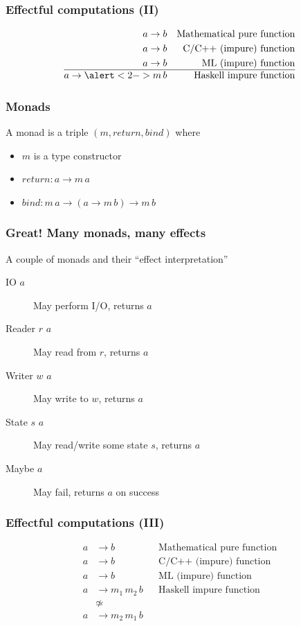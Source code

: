 \begin{frame}
  \frametitle{Effectful computations (II)}
  \begin{align*}
    a \to b && \text{Mathematical pure function}\\
    a \to b && \text{C/C++ (impure) function}\\
    a \to b && \text{ML (impure) function}\\
    \hline
    a \to \alert<2->{m}\, b && \text{Haskell impure function}
  \end{align*}
\end{frame}

\begin{frame}
  \frametitle{Monads}
  \begin{definition}
    A monad is a triple $(m, return, bind)$ where
    \begin{itemize}
      \item $m$ is a type constructor
      \item $return : a \to m\, a$
      \item $bind   : m\, a \to (a \to m\, b) \to m\, b$
    \end{itemize}
  \end{definition}
\end{frame}

\begin{frame}
  \frametitle{Great! Many monads, many effects}
  A couple of monads and their ``effect interpretation''
  \begin{description}
    \item[\alert<1->{IO $a$}] May perform I/O, returns $a$
    \item[\alert<1->{Reader $r$ $a$}] May read from $r$, returns $a$
    \item[\alert<1->{Writer $w$ $a$}] May write to $w$, returns $a$
    \item[\alert<1->{State $s$ $a$}] May read/write some state $s$, returns $a$
    \item[\alert<1->{Maybe $a$}] May fail, returns $a$ on success
  \end{description}
\end{frame}

\begin{frame}
  \frametitle{Effectful computations (III)}
  \begin{align*}
    a &\to b && \text{Mathematical pure function}\\
    a &\to b && \text{C/C++ (impure) function}\\
    a &\to b && \text{ML (impure) function}\\
    \hline
    a &\to m_1\,m_2\, b && \text{Haskell impure function}\\
    & \not\simeq\\
    a &\to m_2\,m_1\, b
  \end{align*}
\end{frame}

